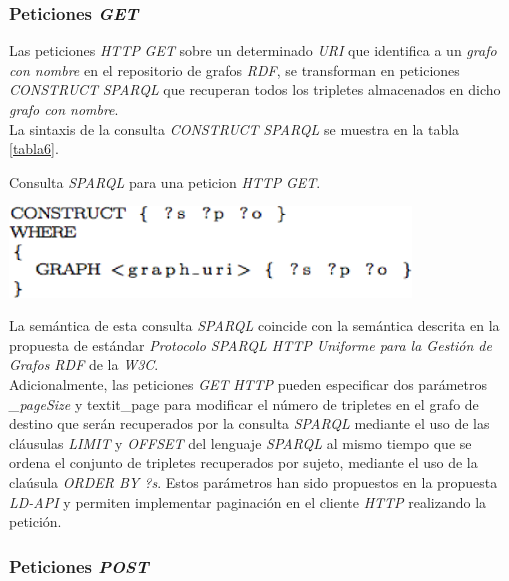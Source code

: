 \subsubsection{Peticiones \textit{GET}}

Las peticiones  \textit{HTTP} \textit{GET} sobre un determinado \textit{URI} que identifica a un \textit{grafo con nombre} en el repositorio de grafos \textit{RDF}, se transforman en peticiones \textit{CONSTRUCT} \textit{SPARQL} que recuperan todos los tripletes almacenados en dicho \textit{grafo con nombre}.\\
La sintaxis de la consulta \textit{CONSTRUCT} \textit{SPARQL} se muestra en la tabla \ref{tabla6}.\\

\begin{table}
\vspace{2.4in}
\caption{Consulta \textit{SPARQL} para una peticion \textit{HTTP} \textit{GET}.}
\vspace{5mm}
\includegraphics[width=0.8\textwidth]{tabla6}
\label{tabla6}
\end{table}


La sem\'antica de esta consulta \textit{SPARQL} coincide con la sem\'antica descrita en la propuesta de est\'andar \textit{Protocolo SPARQL HTTP Uniforme para la Gesti\'on de Grafos RDF} de la \textit{W3C}.\\
Adicionalmente, las peticiones \textit{GET} \textit{HTTP} pueden especificar dos par\'ametros \textit{\_pageSize} y textit{\_page} para modificar el n\'umero de tripletes en el grafo de destino que ser\'an recuperados por la consulta \textit{SPARQL} mediante el uso de las cl\'ausulas \textit{LIMIT} y \textit{OFFSET} del lenguaje \textit{SPARQL} al mismo tiempo que se ordena el conjunto de tripletes recuperados por sujeto, mediante el uso de la cla\'usula \textit{ORDER BY ?s}. Estos par\'ametros han sido propuestos en la propuesta \textit{LD-API} y permiten implementar paginaci\'on en el cliente \textit{HTTP} realizando la petici\'on.

\subsubsection{Peticiones \textit{POST}}

